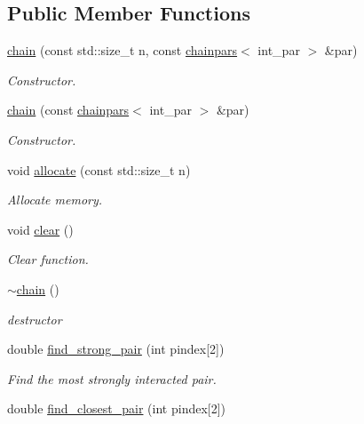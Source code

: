 \subsection*{Public Member Functions}
\begin{DoxyCompactItemize}
\item 
\hyperlink{classARC_1_1chain_af5c20ba1cd4cbefc736e1df84962dbe1}{chain} (const std\+::size\+\_\+t n, const \hyperlink{classARC_1_1chainpars}{chainpars}$<$ int\+\_\+par $>$ \&par)
\begin{DoxyCompactList}\small\item\em Constructor. \end{DoxyCompactList}\item 
\hyperlink{classARC_1_1chain_a5f8a260f762232ba4a823de1815416ef}{chain} (const \hyperlink{classARC_1_1chainpars}{chainpars}$<$ int\+\_\+par $>$ \&par)
\begin{DoxyCompactList}\small\item\em Constructor. \end{DoxyCompactList}\item 
void \hyperlink{classARC_1_1chain_a0c3c1daffa75873b39d9964eebc6566f}{allocate} (const std\+::size\+\_\+t n)
\begin{DoxyCompactList}\small\item\em Allocate memory. \end{DoxyCompactList}\item 
void \hyperlink{classARC_1_1chain_a61d47f9599d4f7176b8870f825305011}{clear} ()
\begin{DoxyCompactList}\small\item\em Clear function. \end{DoxyCompactList}\item 
\hyperlink{classARC_1_1chain_a4e9c6711eb95c5614cd28b14d33ec3eb}{$\sim$chain} ()
\begin{DoxyCompactList}\small\item\em destructor \end{DoxyCompactList}\item 
double \hyperlink{classARC_1_1chain_a7e4f81985bb88e0fb0fcc739b9790396}{find\+\_\+strong\+\_\+pair} (int pindex\mbox{[}2\mbox{]})
\begin{DoxyCompactList}\small\item\em Find the most strongly interacted pair. \end{DoxyCompactList}\item 
double \hyperlink{classARC_1_1chain_a0c0cadba6cebb17e4d55b40ac98a608a}{find\+\_\+closest\+\_\+pair} (int pindex\mbox{[}2\mbox{]})

\end{DoxyCompactItemize}
